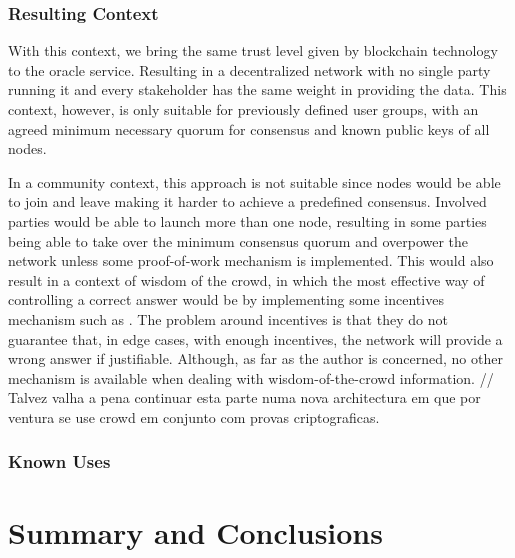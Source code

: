 \subsubsection{Resulting Context}
With this context, we bring the same trust level given by blockchain technology to the oracle service. Resulting in a decentralized network with no single party running it and every stakeholder has the same weight in providing the data. This context, however, is only suitable for previously defined user groups, with an agreed minimum necessary quorum for consensus and known public keys of all nodes.

In a community context, this approach is not suitable since nodes would be able to join and leave making it harder to achieve a predefined consensus. Involved parties would be able to launch more than one node, resulting in some parties being able to take over the minimum consensus quorum and overpower the network unless some proof-of-work mechanism is implemented. This would also result in a context of wisdom of the crowd, in which the most effective way of controlling a correct answer would be by implementing some incentives mechanism such as \cite{AdlerAstraea:Oracle}. The problem around incentives is that they do not guarantee that, in edge cases, with enough incentives, the network will provide a wrong answer if justifiable. Although, as far as the author is concerned, no other mechanism is available when dealing with wisdom-of-the-crowd information. // Talvez valha a pena continuar esta parte numa nova architectura em que por ventura se use crowd em conjunto com provas criptograficas.

\subsubsection{Known Uses}


\section{Summary and Conclusions}
